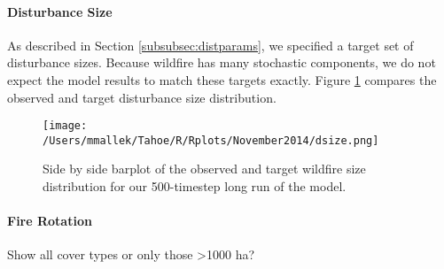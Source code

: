 \paragraph{Disturbance Size}
As described in Section \ref{subsubsec:distparams}, we specified a target set of disturbance sizes. Because wildfire has many stochastic components, we do not expect the model results to match these targets exactly. Figure \ref{fig:dsize} compares the observed and target disturbance size distribution.


\begin{figure}[!htbp]
\centering
\texttt{[image: /Users/mmallek/Tahoe/R/Rplots/November2014/dsize.png]}
\caption{Side by side barplot of the observed and target wildfire size distribution for our 500-timestep long run of the model.}
\label{fig:dsize}
\end{figure}

\paragraph{Fire Rotation}
Show all cover types or only those \textgreater 1000 ha?

